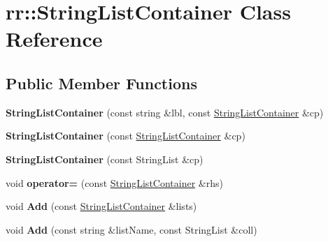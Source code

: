 \hypertarget{classrr_1_1_string_list_container}{\section{rr\-:\-:String\-List\-Container Class Reference}
\label{classrr_1_1_string_list_container}
}
\subsection*{Public Member Functions}
\begin{DoxyCompactItemize}
\item 
\hypertarget{classrr_1_1_string_list_container_ace1c66380039e931b35d65fa8b21b9f0}{{\bfseries String\-List\-Container} (const string \&lbl, const \hyperlink{classrr_1_1_string_list_container}{String\-List\-Container} \&cp)}\label{classrr_1_1_string_list_container_ace1c66380039e931b35d65fa8b21b9f0}

\item 
\hypertarget{classrr_1_1_string_list_container_a10145cd42d7bbdb1fd272bde47eaaa92}{{\bfseries String\-List\-Container} (const \hyperlink{classrr_1_1_string_list_container}{String\-List\-Container} \&cp)}\label{classrr_1_1_string_list_container_a10145cd42d7bbdb1fd272bde47eaaa92}

\item 
\hypertarget{classrr_1_1_string_list_container_a85c0c5019bb6e2fad4cb6ea2e1086b3c}{{\bfseries String\-List\-Container} (const String\-List \&cp)}\label{classrr_1_1_string_list_container_a85c0c5019bb6e2fad4cb6ea2e1086b3c}

\item 
\hypertarget{classrr_1_1_string_list_container_a37fb9e1bd6498fdce821b6641d111293}{void {\bfseries operator=} (const \hyperlink{classrr_1_1_string_list_container}{String\-List\-Container} \&rhs)}\label{classrr_1_1_string_list_container_a37fb9e1bd6498fdce821b6641d111293}

\item 
\hypertarget{classrr_1_1_string_list_container_a9dc950c03d0651773239a946a1b9b56d}{void {\bfseries Add} (const \hyperlink{classrr_1_1_string_list_container}{String\-List\-Container} \&lists)}\label{classrr_1_1_string_list_container_a9dc950c03d0651773239a946a1b9b56d}

\item 
\hypertarget{classrr_1_1_string_list_container_a3c85610f5edf18cd4b7374dde7c3d23d}{void {\bfseries Add} (const string \&list\-Name, const String\-List \&coll)}\label{classrr_1_1_string_list_container_a3c85610f5edf18cd4b7374dde7c3d23d}


\end{DoxyCompactItemize}
